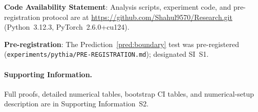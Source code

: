 \documentclass[12pt]{article}
\theoremstyle{remark}
\begin{document}
\noindent\textbf{Code Availability Statement}:
Analysis scripts, experiment code, and pre-registration protocol are at
\url{https://github.com/Shahul9570/Research.git}
(Python~3.12.3, PyTorch~2.6.0+cu124).

\noindent\textbf{Pre-registration}:
The Prediction~\ref{pred:boundary} test was pre-registered
(\texttt{experiments/pythia/PRE-REGISTRATION.md}); designated SI~S1.

\paragraph{Supporting Information.}
Full proofs, detailed numerical tables, bootstrap CI tables, and numerical-setup description are in Supporting Information~S2.


\end{document}
